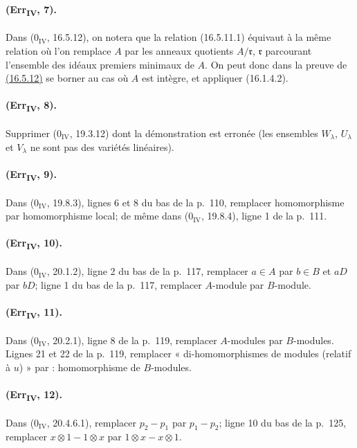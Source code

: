 \paragraph{(Err\textsubscript{IV}, 7).}
Dans ($0_{\mathrm{IV}}$, 16.5.12), on notera que la relation
(16.5.11.1) équivaut à la même relation où l'on remplace $A$ par les
anneaux quotients $A/\mathfrak r$, $\mathfrak r$ parcourant l'ensemble
des idéaux premiers minimaux de $A$. On peut donc dans la preuve de
{\hyperlink{ega4.c04.statement.16-5-12}{(16.5.12)}} se borner au cas
où $A$ est intègre, et appliquer (16.1.4.2).

\paragraph{(Err\textsubscript{IV}, 8).}
Supprimer ($0_{\mathrm{IV}}$, 19.3.12) dont la démonstration est erronée
(les ensembles $W_\lambda$, $U_\lambda$ et $V_\lambda$ ne sont pas des
variétés linéaires).

\paragraph{(Err\textsubscript{IV}, 9).}
Dans ($0_{\mathrm{IV}}$, 19.8.3), lignes 6 et 8 du bas de la p.~110,
remplacer homomorphisme par homomorphisme local; de même dans
($0_{\mathrm{IV}}$, 19.8.4), ligne 1 de la p.~111.

\paragraph{(Err\textsubscript{IV}, 10).}
Dans ($0_{\mathrm{IV}}$, 20.1.2), ligne 2 du bas de la p.~117,
remplacer $a\in A$ par $b\in B$ et $aD$ par $bD$; ligne 1 du bas de la
p.~117, remplacer $A$-module par $B$-module.

\paragraph{(Err\textsubscript{IV}, 11).}
Dans ($0_{\mathrm{IV}}$, 20.2.1), ligne 8 de la p.~119, remplacer
$A$-modules par $B$-modules. Lignes 21 et 22 de la p.~119, remplacer
« di-homomorphismes de modules (relatif à $u$) » par : homomorphisme
de $B$-modules.

\paragraph{(Err\textsubscript{IV}, 12).}
Dans ($0_{\mathrm{IV}}$, 20.4.6.1), remplacer $p_2-p_1$ par $p_1-p_2$;
ligne 10 du bas de la p.~125, remplacer $x\otimes1-1\otimes x$ par
$1\otimes x-x\otimes1$.

